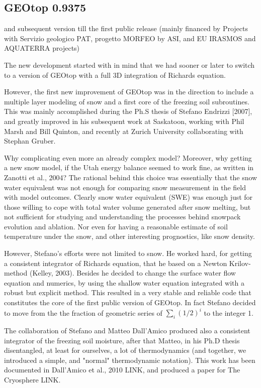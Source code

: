 \subsection{GEOtop 0.9375}
 and subsequent version till the first public release
(mainly financed by Projects with Servizio geologico PAT, progetto MORFEO by ASI, and EU IRASMOS and  AQUATERRA projects)

The new development started with in mind that we had sooner or later to switch to a version of GEOtop with a full 3D integration of Richards equation. 

However, the first new improvement of GEOtop was in the direction to include a multiple layer  modeling of snow and a first core of the freezing soil subroutines.  This was mainly accomplished during the Ph.S thesis of Stefano Endrizzi [2007], and greatly improved in his subsequent work at Saskatoon, working with Phil Marsh and Bill Quinton, and recently at Zurich University collaborating with  Stephan Gruber. 

Why complicating even more an already complex model? Moreover, why getting a new snow model, if the Utah energy balance seemed to work fine, as written in Zanotti et al., 2004?
The rational behind this choice was essentially that the snow water equivalent was not enough for comparing snow measurement in the field with model outcomes. Clearly snow water equivalent (SWE) was enough just for those willing to cope with total water volume generated after snow melting, but not sufficient for studying and understanding the processes behind snowpack evolution and ablation. Nor even for having a reasonable estimate of soil temperature under the snow, and other interesting prognostics, like snow density. 

However, Stefano's efforts were not limited to snow. He worked hard, for getting a consistent integrator of Richards equation, that he based on a Newton Krilov-method (Kelley, 2003).  Besides he decided to change the surface water flow  equation and numerics, by using the shallow water equation integrated with a robust but explicit method.  This resulted in a very stable and reliable code that constitutes the core of the first public version of GEOtop. In fact Stefano decided to move from the the fraction of geometric series of  $\sum_i (1/2)^i$ to the integer 1.

The collaboration of Stefano and Matteo Dall'Amico produced also a consistent integrator of the freezing soil moisture, after that Matteo, in his Ph.D thesis disentangled, at least for ourselves,  a lot of thermodynamics (and together, we introduced a simple, and "normal" thermodynamic notation). This work has been documented in Dall'Amico et al., 2010 LINK, and produced a paper for The Cryosphere LINK. 

